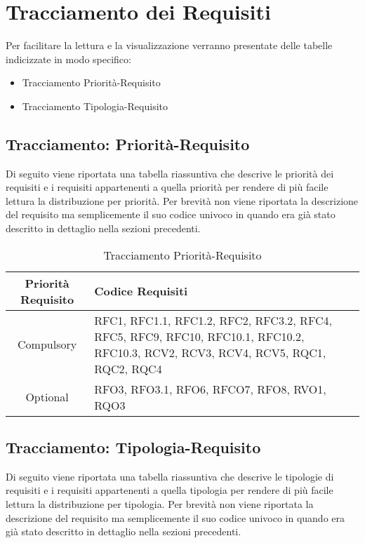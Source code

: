 
\section{Tracciamento dei Requisiti}
Per facilitare la lettura e la visualizzazione verranno presentate delle tabelle indicizzate in modo specifico:
\begin{itemize}
    \item Tracciamento Priorità-Requisito
    \item Tracciamento Tipologia-Requisito
\end{itemize}

\newpage
\subsection{Tracciamento: Priorità-Requisito}
Di seguito viene riportata una tabella riassuntiva che descrive le priorità dei requisiti e i requisiti appartenenti a quella priorità per rendere di più facile lettura la distribuzione per priorità.
Per brevità non viene riportata la descrizione del requisito ma semplicemente il suo codice univoco in quando era già stato descritto in dettaglio nella sezioni precedenti.   

\begin{table}[!htbp] %
            \centering
            \renewcommand{\arraystretch}{2} %
            \begin{tabular}{|c|p{2cm}|} %
                \rowcolor{orange!50} %
        		\hline
        		\textbf{Priorità Requisito} & \textbf{Codice Requisiti} \\
                \hline
                Compulsory & RFC1, RFC1.1, RFC1.2, RFC2, RFC3.2, RFC4, RFC5, RFC9, RFC10, RFC10.1, RFC10.2, RFC10.3, RCV2, RCV3, RCV4, RCV5, RQC1, RQC2, RQC4\\
                \hline
                Optional & RFO3, RFO3.1, RFO6, RFCO7, RFO8, RVO1, RQO3\\
                \hline
        \end{tabular}
        \caption{Tracciamento Priorità-Requisito} %
\end{table}

\newpage
\subsection{Tracciamento: Tipologia-Requisito}
Di seguito viene riportata una tabella riassuntiva che descrive le tipologie di requisiti e i requisiti appartenenti a quella tipologia per rendere di più facile lettura la distribuzione per tipologia.
Per brevità non viene riportata la descrizione del requisito ma semplicemente il suo codice univoco in quando era già stato descritto in dettaglio nella sezioni precedenti.

